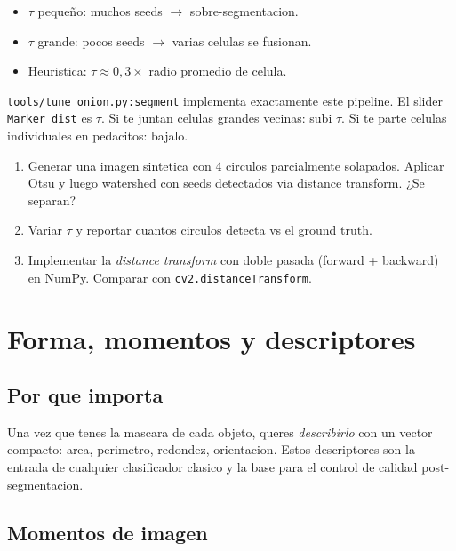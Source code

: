 \documentclass[11pt,a4paper,twoside,openright]{book}
\begin{document}
\begin{itemize}[leftmargin=2em]
  \item $\tau$ pequeño: muchos seeds $\to$ sobre-segmentacion.
  \item $\tau$ grande: pocos seeds $\to$ varias celulas se fusionan.
  \item Heuristica: $\tau \approx 0{,}3 \times $ radio promedio de celula.
\end{itemize}

\begin{pipeline}
\texttt{tools/tune\_onion.py:segment} implementa exactamente este pipeline. El slider \texttt{Marker dist} es $\tau$. Si te juntan celulas grandes vecinas: subi $\tau$. Si te parte celulas individuales en pedacitos: bajalo.
\end{pipeline}

\begin{ejercicio}
\begin{enumerate}[leftmargin=2em]
  \item Generar una imagen sintetica con 4 circulos parcialmente solapados. Aplicar Otsu y luego watershed con seeds detectados via distance transform. ¿Se separan?
  \item Variar $\tau$ y reportar cuantos circulos detecta vs el ground truth.
  \item Implementar la \emph{distance transform} con doble pasada (forward + backward) en NumPy. Comparar con \texttt{cv2.distanceTransform}.
\end{enumerate}
\end{ejercicio}

\chapter{Forma, momentos y descriptores}
\label{ch:forma}

\section{Por que importa}

Una vez que tenes la mascara de cada objeto, queres \emph{describirlo} con un vector compacto: area, perimetro, redondez, orientacion. Estos descriptores son la entrada de cualquier clasificador clasico y la base para el control de calidad post-segmentacion.

\section{Momentos de imagen}
\end{document}

